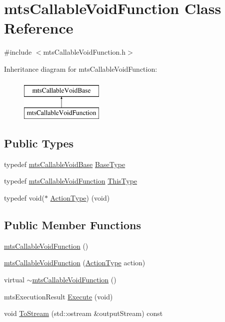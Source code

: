 \hypertarget{classmts_callable_void_function}{}\section{mts\+Callable\+Void\+Function Class Reference}
\label{classmts_callable_void_function}


{\ttfamily \#include $<$mts\+Callable\+Void\+Function.\+h$>$}

Inheritance diagram for mts\+Callable\+Void\+Function\+:\begin{figure}[H]
\begin{center}
\leavevmode
\includegraphics[height=2.000000cm]{d2/d03/classmts_callable_void_function}
\end{center}
\end{figure}
\subsection*{Public Types}
\begin{DoxyCompactItemize}
\item 
typedef \hyperlink{classmts_callable_void_base}{mts\+Callable\+Void\+Base} \hyperlink{classmts_callable_void_function_a9a675710ec6f9f9e3bd9ed8b22755585}{Base\+Type}
\item 
typedef \hyperlink{classmts_callable_void_function}{mts\+Callable\+Void\+Function} \hyperlink{classmts_callable_void_function_a4885dc4c6ac40e229baca8146d328ae1}{This\+Type}
\item 
typedef void($\ast$ \hyperlink{classmts_callable_void_function_a2df84595ba2652ef1d50d1297b023fd5}{Action\+Type}) (void)
\end{DoxyCompactItemize}
\subsection*{Public Member Functions}
\begin{DoxyCompactItemize}
\item 
\hyperlink{classmts_callable_void_function_a81ec2fae6358fd930b74b1c697e33c4a}{mts\+Callable\+Void\+Function} ()
\item 
\hyperlink{classmts_callable_void_function_a31135fe8eaad23b834794201ca081d6a}{mts\+Callable\+Void\+Function} (\hyperlink{classmts_callable_void_function_a2df84595ba2652ef1d50d1297b023fd5}{Action\+Type} action)
\item 
virtual \hyperlink{classmts_callable_void_function_a6156a087323cf3dd618faf2a02abdcfd}{$\sim$mts\+Callable\+Void\+Function} ()
\item 
mts\+Execution\+Result \hyperlink{classmts_callable_void_function_a45faf2d05a2e89e5fc5e9cb0ec39fc98}{Execute} (void)
\item 
void \hyperlink{classmts_callable_void_function_adc5449fa0167851e7f2edd3c66943fa6}{To\+Stream} (std\+::ostream \&output\+Stream) const 
\end{DoxyCompactItemize}
